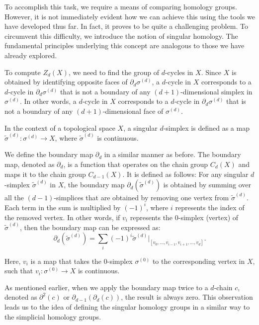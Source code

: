 To accomplish this task, we require a means of comparing homology groups.
However, it is not immediately evident how we can achieve this using the tools we
have developed thus far. In fact, it proves to be quite a challenging problem.
To circumvent this difficulty, we introduce the notion of singular homology. The
fundamental principles underlying this concept are analogous to those we have
already explored.

To compute $Z_{d}(X)$, we need to find the group of $d$-cycles in $X$. Since $X$
is obtained by identifying opposite faces of $\partial_{d} \sigma^{(d)}$, a $d$-cycle
in $X$ corresponds to a $d$-cycle in $\partial_{d} \sigma^{(d)}$ that is not a boundary
of any $(d+1)$-dimensional simplex in $\sigma^{(d)}$. In other words, a $d$-cycle
in $X$ corresponds to a $d$-cycle in $\partial_{d} \sigma^{(d)}$ that is not a boundary
of any $(d+1)$-dimensional face of $\sigma^{(d)}$.

\begin{definition}
	In the context of a topological space $X$, a singular $d$-simplex is defined as a map $\tilde{\sigma}^{(d)}: \sigma^{(d)}\to X$,
	where $\tilde{\sigma}^{(d)}$ is continuous.
\end{definition}

We define the boundary map $\partial_{d}$ in a similar manner as before. The boundary
map, denoted as $\partial_{d}$, is a function that operates on the chain group $C
_{d}(X)$ and maps it to the chain group $C_{d-1}(X)$. It is defined as follows: For
any singular $d$-simplex $\tilde{\sigma}^{(d)}$ in $X$, the boundary map
$\partial_{d}(\tilde{\sigma}^{(d)})$ is obtained by summing over all the $(d-1)$-simplices
that are obtained by removing one vertex from $\tilde{\sigma}^{(d)}$. Each term in
the sum is multiplied by $(-1)^{i}$, where $i$ represents the index of the
removed vertex. In other words, if $v_{i}$ represents the $0$-simplex (vertex)
of $\tilde{\sigma}^{(d)}$, then the boundary map can be expressed as:
\begin{equation}
	\partial_{d}(\tilde{\sigma}^{(d)}) = \sum_{i}(-1)^{i} \tilde{\sigma}^{(d)}\vert
	_{[v_0, \ldots, v_{i-1}, v_{i+1}, \ldots, v_d]}.
\end{equation}

Here, $v_{i}$ is a map that takes the $0$-simplex $\sigma^{(0)}$ to the
corresponding vertex in $X$, such that $v_{i}: \sigma^{(0)}\to X$ is continuous.

As mentioned earlier, when we apply the boundary map twice to a $d$-chain $c$, denoted
as $\partial^{2}(c)$ or $\partial_{d-1}(\partial_{d}(c))$, the result is always
zero. This observation leads us to the idea of defining the singular homology groups
in a similar way to the simplicial homology groups.

